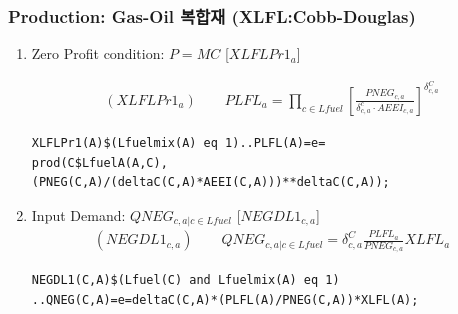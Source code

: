 \documentclass[10pt,compress,slidetop,%
			   hyperref={unicode},xcolor={svgnames},%
			   t]{beamer}
\begin{document}
\begin{frame}[fragile]
\frametitle{Production: Gas-Oil 복합재 (XLFL:Cobb-Douglas)}


\begin{scriptsize}
\begin{enumerate}
\item{Zero Profit condition: $P=MC$ [$XLFLPr1_a$]}

\begin{eqnarray*}
(XLFLPr1_a)\qquad PLFL_a=\prod_{c\in Lfuel}\left[\frac{PNEG_{c,a}}{\delta^c_{c,a}\cdot AEEI_{c,a}}\right]^{\delta^C_{c,a}}
\end{eqnarray*}

\begin{verbatim}
XLFLPr1(A)$(Lfuelmix(A) eq 1)..PLFL(A)=e=
prod(C$LfuelA(A,C),(PNEG(C,A)/(deltaC(C,A)*AEEI(C,A)))**deltaC(C,A));
\end{verbatim}
\item{Input Demand: $QNEG_{c,a|c \in Lfuel}$ [$NEGDL1_{c,a}$]}
\begin{eqnarray*}
(NEGDL1_{c,a})\qquad QNEG_{c,a|c \in Lfuel}=\delta^C_{c,a}\frac{PLFL_a}{PNEG_{c,a}}XLFL_a
\end{eqnarray*}

\begin{verbatim}
NEGDL1(C,A)$(Lfuel(C) and Lfuelmix(A) eq 1)
..QNEG(C,A)=e=deltaC(C,A)*(PLFL(A)/PNEG(C,A))*XLFL(A);
\end{verbatim}

\end{enumerate}
\end{scriptsize}
\end{frame}
\end{document}
